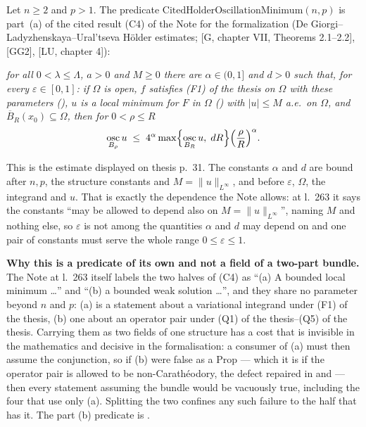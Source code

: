 \begin{definition}
Let $n\ge2$ and $p>1$.  The predicate
$\mathrm{CitedHolderOscillationMinimum}(n,p)$ is part~(a) of the cited result
(C4) of the Note for the formalization (De
Giorgi--Ladyzhenskaya--Ural'tseva H\"older estimates;
[G, chapter VII, Theorems 2.1--2.2], [GG2], [LU, chapter 4]):

\emph{for all $0<\lambda\le\Lambda$, $a>0$ and
$M\ge0$ there are $\alpha\in(0,1]$ and $d>0$ such that, for every
$\varepsilon\in[0,1]$: if $\Omega$ is open, $f$ satisfies (F1) of the thesis on
$\Omega$ with these parameters (), $u$ is a local
minimum for $F$ in $\Omega$ () with $|u|\le M$ a.e.\ on
$\Omega$, and $\overline B_R(x_0)\subseteq\Omega$, then for $0<\rho\le R$}
\[
\operatorname*{osc}_{B_\rho}u\;\le\;4^\alpha\max\Bigl\{\operatorname*{osc}_{B_R}u,\;dR\Bigr\}\Bigl(\frac\rho R\Bigr)^\alpha .
\]

This is the estimate displayed on thesis p.~31.  The constants $\alpha$ and $d$
are bound after $n,p$, the structure constants and $M=\|u\|_{L^\infty}$, and
before $\varepsilon$, $\Omega$, the integrand and $u$.  That is exactly the
dependence the Note allows: at l.~263 it says the constants ``may be allowed to
depend also on $M=\|u\|_{L^\infty}$'', naming $M$ and nothing else, so
$\varepsilon$ is not among the quantities $\alpha$ and $d$ may depend on and
one pair of constants must serve the whole range $0\le\varepsilon\le1$.

\medskip
\noindent\textbf{Why this is a predicate of its own and not a field of a
two-part bundle.}  The Note at l.~263 itself labels the two halves of (C4) as
``(a) A bounded local minimum \ldots'' and ``(b) a bounded weak solution
\ldots'', and they share no parameter beyond $n$ and $p$: (a) is a statement
about a variational integrand under (F1) of the thesis, (b) one about an operator
pair under (Q1) of the thesis--(Q5) of the thesis.  Carrying them as two fields of one
structure has a cost that is invisible in the mathematics and decisive in the
formalisation: a consumer of (a) must then assume the conjunction, so if (b)
were false as a $\mathrm{Prop}$ --- which it is if the operator pair is allowed
to be non-Carath\'eodory, the defect repaired in
 and  --- then
every statement assuming the bundle would be vacuously true, including the four
that use only (a).  Splitting the two confines any such failure to the half that
has it.  The part (b) predicate is .


\end{definition}
